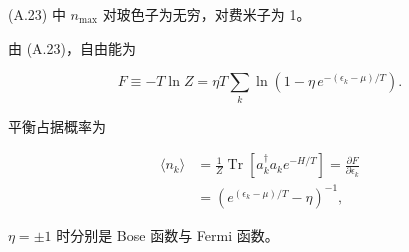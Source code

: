 (A.23) 中 $n_{\mathrm{max}}$ 对玻色子为无穷，对费米子为 1。

由 (A.23)，自由能为

\begin{equation*}
F \equiv -T \ln Z = \eta T \sum_ {k} \ln \left( 1 - \eta \, e ^ {- \left( \epsilon_ {k} - \mu \right) /T} \right).
\tag{A.24}
\end{equation*}

平衡占据概率为

\begin{align*}
\langle n _ {k} \rangle & = \frac {1}{Z} \operatorname{Tr} \left[ a _ {k} ^ {\dagger} a _ {k} e ^ {- H /T} \right] = \frac {\partial F}{\partial \epsilon_ {k}}\\
& = \left( e ^ {\left( \epsilon_ {k} - \mu \right) /T} - \eta \right) ^ {- 1} ,
\tag{A.25}
\end{align*}

$\eta = \pm1$ 时分别是 Bose 函数与 Fermi 函数。

